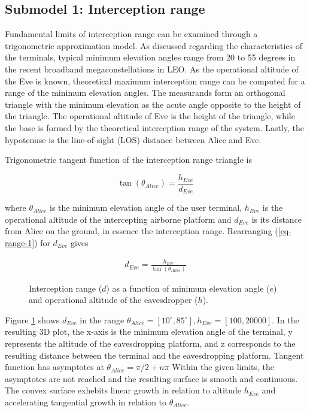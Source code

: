 \documentclass[english, 12pt, a4paper, elec, utf8, a-1b, online]{aaltothesis}
\begin{document}
\subsection{Submodel 1: Interception range}

Fundamental limits of interception range can be examined through a trigonometric approximation model.
As discussed regarding the characteristics of the terminals, typical minimum elevation angles range from 20 to 55 degrees in the recent broadband megaconstellations in LEO.
As the operational altitude of the Eve is known, theoretical maximum interception range can be computed for a range of the minimum elevation angles.
The measurands form an orthogonal triangle with the minimum elevation as the acute angle opposite to the height of the triangle.
The operational altitude of Eve is the height of the triangle, while the base is formed by the theoretical interception range of the system.
Lastly, the hypotenuse is the line-of-sight (LOS) distance between Alice and Eve.

Trigonometric tangent function of the interception range triangle is

\begin{equation} \label{eq-range-1}
  \tan(\theta_{Alice}) = \frac{h_{Eve}}{d_{Eve}}
\end{equation}

\noindent
where $\theta_{Alice}$ is the minimum elevation angle of the user terminal, $h_{Eve}$ is the operational altitude of the intercepting airborne platform and $d_{Eve}$ is its distance from Alice on the ground, in essence the interception range.
Rearranging (\ref{eq-range-1}) for $d_{Eve}$ gives

\begin{align} \label{eq-range-2}
  d_{Eve} = \frac{h_{Eve}}{\tan(\theta_{Alice})}
\end{align}

\begin{figure}[h]
  \centering
  
  \caption{Interception range ($d$) as a function of minimum elevation angle ($e$) and operational altitude of the eavesdropper ($h$).}
  \label{fig-interception-range}
\end{figure}

\noindent
Figure \ref{fig-interception-range} shows $d_{Eve}$ in the range $\theta_{Alice} = [10^\circ, 85^\circ], h_{Eve} = [100,20000]$.
In the resulting 3D plot, the x-axis is the minimum elevation angle of the terminal, y represents the altitude of the eavesdropping platform, and z corresponds to the resulting distance between the terminal and the eavesdropping platform.
Tangent function has asymptotes at $\theta_{Alice} = \pi / 2 + n\pi$ Within the given limits, the asymptotes are not reached and the resulting surface is smooth and continuous.
The convex surface exhebits linear growth in relation to altitude $h_{Eve}$ and accelerating tangential growth in relation to $\theta_{Alice}$.
\end{document}
